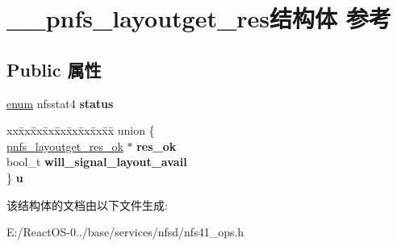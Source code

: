 \hypertarget{struct____pnfs__layoutget__res}{}\section{\+\_\+\+\_\+pnfs\+\_\+layoutget\+\_\+res结构体 参考}
\label{struct____pnfs__layoutget__res}
\subsection*{Public 属性}
\begin{DoxyCompactItemize}
\item 
\mbox{\label{struct____pnfs__layoutget__res_a25e70dcb75882c9cea70faed09229357}} 
\hyperlink{interfaceenum}{enum} nfsstat4 {\bfseries status}
\item 
\mbox{\label{struct____pnfs__layoutget__res_a6973e925e784b6c9a6254e017b806ecc}} 
\begin{tabbing}
xx\=xx\=xx\=xx\=xx\=xx\=xx\=xx\=xx\=\kill
union \{\\
\>\hyperlink{struct____pnfs__layoutget__res__ok}{pnfs\_layoutget\_res\_ok} $\ast$ {\bfseries res\_ok}\\
\>bool\_t {\bfseries will\_signal\_layout\_avail}\\
\} {\bfseries u}\\

\end{tabbing}\end{DoxyCompactItemize}


该结构体的文档由以下文件生成\+:\begin{DoxyCompactItemize}
\item 
E\+:/\+React\+O\+S-\/0../base/services/nfsd/nfs41\+\_\+ops.\+h\end{DoxyCompactItemize}
